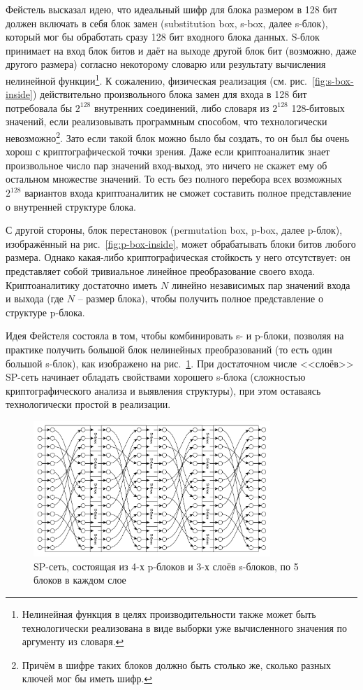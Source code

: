 Фейстель высказал идею, что идеальный шифр для блока размером в 128 бит должен включать в себя блок замен (substitution box, s-box, далее s-блок), который мог бы обработать сразу 128 бит входного блока данных. S-блок принимает на вход блок битов и даёт на выходе другой блок бит (возможно, даже другого размера) согласно некоторому словарю или результату вычисления нелинейной функции\footnote{Нелинейная функция в целях производительности также может быть технологически реализована в виде выборки уже вычисленного значения по аргументу из словаря.}. К сожалению, физическая реализация (см. рис.~\ref{fig:s-box-inside}) действительно произвольного блока замен для входа в 128 бит потребовала бы $2^{128}$ внутренних соединений, либо словаря из $2^{128}$ 128-битовых значений, если реализовывать программным способом, что технологически невозможно\footnote{Причём в шифре таких блоков должно быть столько же, сколько разных ключей мог бы иметь шифр.}. Зато если такой блок можно было бы создать, то он был бы очень хорош с криптографической точки зрения. Даже если криптоаналитик знает произвольное число пар значений вход-выход, это ничего не скажет ему об остальном множестве значений. То есть без полного перебора всех возможных $2^{128}$ вариантов входа криптоаналитик не сможет составить полное представление о внутренней структуре блока.

С другой стороны, блок перестановок (permutation box, p-box, далее p-блок), изображённый на рис.~\ref{fig:p-box-inside}, может обрабатывать блоки битов любого размера. Однако какая-либо криптографическая стойкость у него отсутствует: он представляет собой тривиальное линейное преобразование своего входа. Криптоаналитику достаточно иметь $N$ линейно независимых пар значений входа и выхода (где $N$ -- размер блока), чтобы получить полное представление о структуре p-блока.

Идея Фейстеля состояла в том, чтобы комбинировать s- и p-блоки, позволяя на практике получить большой блок нелинейных преобразований (то есть один большой s-блок), как изображено на рис.~\ref{fig:sp-network}. При достаточном числе <<слоёв>> SP-сеть начинает обладать свойствами хорошего s-блока (сложностью криптографического анализа и выявления структуры), при этом оставаясь технологически простой в реализации.

\begin{figure}[htb]
	\centering
	\includegraphics[width=0.8\textwidth]{pic/sp-network}
  \caption{SP-сеть, состоящая из 4-х p-блоков и 3-х слоёв s-блоков, по 5 блоков в каждом слое}
  \label{fig:sp-network}
\end{figure}

